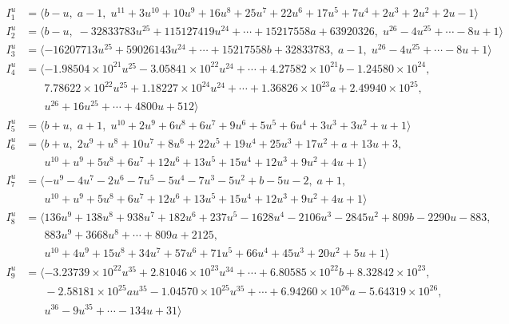 \documentclass[1p]{elsarticle_modified}
\theoremstyle{definition}
\begin{document}
\begin{align*}
I^u_{1}&=\langle 
b- u,\;a-1,\;u^{11}+3 u^{10}+10 u^9+16 u^8+25 u^7+22 u^6+17 u^5+7 u^4+2 u^3+2 u^2+2 u-1\rangle \\
I^u_{2}&=\langle 
b- u,\;-32833783 u^{25}+115127419 u^{24}+\cdots+15217558 a+63920326,\;u^{26}-4 u^{25}+\cdots-8 u+1\rangle \\
I^u_{3}&=\langle 
-16207713 u^{25}+59026143 u^{24}+\cdots+15217558 b+32833783,\;a-1,\;u^{26}-4 u^{25}+\cdots-8 u+1\rangle \\
I^u_{4}&=\langle 
-1.98504\times10^{21} u^{25}-3.05841\times10^{22} u^{24}+\cdots+4.27582\times10^{21} b-1.24580\times10^{24},\\
\phantom{I^u_{4}}&\phantom{= \langle  }7.78622\times10^{22} u^{25}+1.18227\times10^{24} u^{24}+\cdots+1.36826\times10^{23} a+2.49940\times10^{25},\\
\phantom{I^u_{4}}&\phantom{= \langle  }u^{26}+16 u^{25}+\cdots+4800 u+512\rangle \\
I^u_{5}&=\langle 
b+u,\;a+1,\;u^{10}+2 u^9+6 u^8+6 u^7+9 u^6+5 u^5+6 u^4+3 u^3+3 u^2+u+1\rangle \\
I^u_{6}&=\langle 
b+u,\;2 u^9+u^8+10 u^7+8 u^6+22 u^5+19 u^4+25 u^3+17 u^2+a+13 u+3,\\
\phantom{I^u_{6}}&\phantom{= \langle  }u^{10}+u^9+5 u^8+6 u^7+12 u^6+13 u^5+15 u^4+12 u^3+9 u^2+4 u+1\rangle \\
I^u_{7}&=\langle 
- u^9-4 u^7-2 u^6-7 u^5-5 u^4-7 u^3-5 u^2+b-5 u-2,\;a+1,\\
\phantom{I^u_{7}}&\phantom{= \langle  }u^{10}+u^9+5 u^8+6 u^7+12 u^6+13 u^5+15 u^4+12 u^3+9 u^2+4 u+1\rangle \\
I^u_{8}&=\langle 
136 u^9+138 u^8+938 u^7+182 u^6+237 u^5-1628 u^4-2106 u^3-2845 u^2+809 b-2290 u-883,\\
\phantom{I^u_{8}}&\phantom{= \langle  }883 u^9+3668 u^8+\cdots+809 a+2125,\\
\phantom{I^u_{8}}&\phantom{= \langle  }u^{10}+4 u^9+15 u^8+34 u^7+57 u^6+71 u^5+66 u^4+45 u^3+20 u^2+5 u+1\rangle \\
I^u_{9}&=\langle 
-3.23739\times10^{22} u^{35}+2.81046\times10^{23} u^{34}+\cdots+6.80585\times10^{22} b+8.32842\times10^{23},\\
\phantom{I^u_{9}}&\phantom{= \langle  }-2.58181\times10^{25} a u^{35}-1.04570\times10^{25} u^{35}+\cdots+6.94260\times10^{26} a-5.64319\times10^{26},\\
\phantom{I^u_{9}}&\phantom{= \langle  }u^{36}-9 u^{35}+\cdots-134 u+31\rangle \\
\\
\end{align*}
\end{document}
